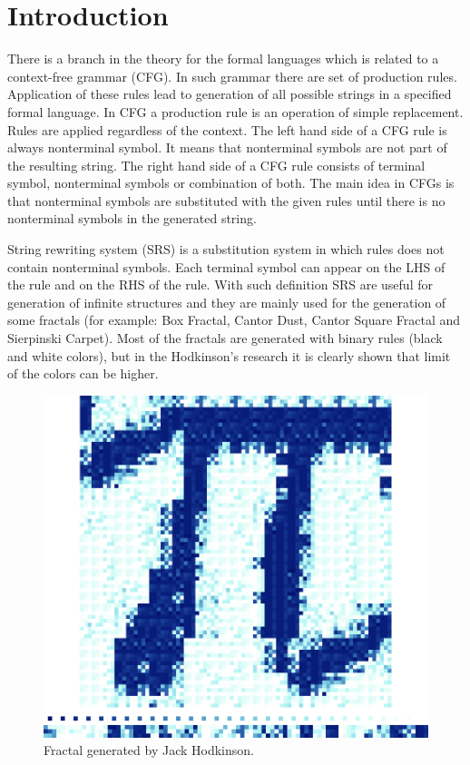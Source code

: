 \documentclass{llncs}
\begin{document}
\section{Introduction} \label{Introduction}

There is a branch in the theory for the formal languages which is related to a context-free grammar (CFG). In such grammar there are set of production rules. Application of these rules lead to generation of all possible strings in a specified formal language. In CFG a production rule is an operation of simple replacement. Rules are applied regardless of the context. The left hand side of a CFG rule is always nonterminal symbol. It means that nonterminal symbols are not part of the resulting string. The right hand side of a CFG rule consists of terminal symbol, nonterminal symbols or combination of both. The main idea in CFGs is that nonterminal symbols are substituted with the given rules until there is no nonterminal symbols in the generated string. 

String rewriting system (SRS) is a substitution system in which rules does not contain nonterminal symbols. Each terminal symbol can appear on the LHS of the rule and on the RHS of the rule. With such definition SRS are useful for generation of infinite structures and they are mainly used for the generation of some fractals (for example: Box Fractal, Cantor Dust, Cantor Square Fractal and Sierpinski Carpet). Most of the fractals are generated with binary rules (black and white colors), but in the Hodkinson's research it is clearly shown that limit of the colors can be higher. 

\begin{figure}[h]
  \centering
  \includegraphics[width=1.0\linewidth]{pic01}
  \caption{Fractal generated by Jack Hodkinson.}
\label{fig:pic01}
\end{figure}
\end{document}
